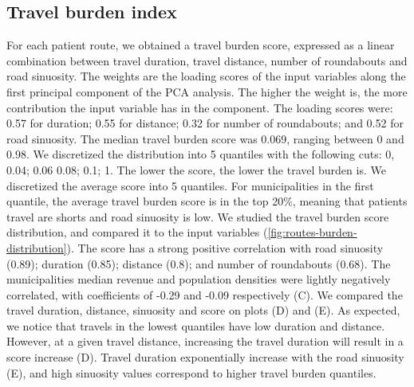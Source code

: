 \subsection{Travel burden index}

For each patient route, we obtained a travel burden score, expressed as a linear
combination between travel duration, travel distance, number of roundabouts and
road sinuosity. The weights are the loading scores of the input variables along
the first principal component of the PCA analysis. The higher the weight is, the
more contribution the input variable has in the component. The loading scores
were: 0.57 for duration; 0.55 for distance; 0.32 for number of roundabouts; and
0.52 for road sinuosity. The median travel burden score was 0.069, ranging
between 0 and 0.98. We discretized the distribution into 5 quantiles with the
following cuts: 0, 0.04; 0.06 0.08; 0.1; 1. The lower the score, the lower the
travel burden is. We discretized the average score into 5 quantiles. For
municipalities in the first quantile, the average travel burden score is in the
top 20\%, meaning that patients travel are shorts and road sinuosity is low.
We studied the travel burden score distribution, and compared it to the input
variables (\cref{fig:routes-burden-distribution}). The score has a strong
positive correlation with road sinuosity (0.89); duration (0.85);
distance (0.8); and number of roundabouts (0.68). The municipalities
median revenue and population densities were lightly negatively correlated,
with coefficients of -0.29 and -0.09 respectively (C). We compared the travel
duration, distance, sinuosity and score on plots (D) and (E). As expected,
we notice that travels in the lowest quantiles have low duration and distance.
However, at a given travel distance, increasing the travel duration will result
in a score increase (D). Travel duration exponentially increase with the road
sinuosity (E), and high sinuosity values correspond to higher travel burden
quantiles.

